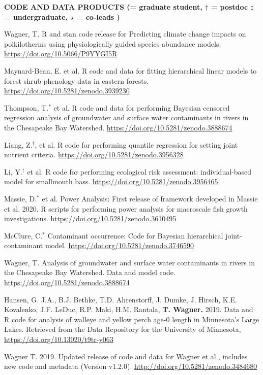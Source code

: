 \documentclass[10pt]{article}
\begin{document}
\begin{flushleft}
\centerline {\bf{CODE AND DATA PRODUCTS ({\small * = graduate student, $\dagger$ = postdoc $\ddagger$ = undergraduate, $\star$ = co-leads })}}
\vspace{5pt}
\begin{etaremune}
	\item Wagner, T. R and stan code release for Predicting climate change impacts on poikilotherms using physiologically guided species abundance models. \url{https://doi.org/10.5066/P9YYGI5R}
	\item Maynard-Bean, E. et al. R code and data for fitting hierarchical linear models to forest shrub phenology data in eastern forests. \url{https://doi.org/10.5281/zenodo.3939230}
	\item Thompson, T.$^*$ et al. R code and data for performing Bayesian censored regression analysis of groundwater and surface water contaminants in rivers in the Chesapeake Bay Watershed. \url{https://doi.org/10.5281/zenodo.3888674}
	\item Liang, Z.$^\dagger$, et al. R code for performing quantile regression for setting joint nutrient criteria. \url{https://doi.org/10.5281/zenodo.3956328}
	\item Li, Y.$^\dagger$ et al. R code for performing ecological risk assessment: individual-based model for smallmouth bass. \url{https://doi.org/10.5281/zenodo.3956465}
	\item Massie, D.$^*$ et al. Power Analysis: First release of framework developed in Massie et al. 2020. R scripts for performing power analysis for macroscale fish growth investigations. \url{https://doi.org/10.5281/zenodo.3610495}
	\item McClure, C.$^*$ Contaminant occurrence: Code for Bayesian hierarchical joint-contaminant model. \url{https://doi.org/10.5281/zenodo.3746590}
	\item Wagner, T. Analysis of groundwater and surface water contaminants in rivers in the Chesapeake Bay Watershed. Data and model code. \url{https://doi.org/10.5281/zenodo.3888674}
	\item Hansen, G. J.A., B.J. Bethke, T.D. Ahrenstorff,  J. Dumke, J.  Hirsch,  K.E. Kovalenko,  J.F. LeDuc, R.P.  Maki,  H.M. Rantala, \textbf{T. Wagner.} 2019. Data and R code for analysis of walleye and yellow perch age-0 length in Minnesota's Large Lakes. Retrieved from the Data Repository for the University of Minnesota, \url{https://doi.org/10.13020/t9tr-y063}
\item Wagner T. 2019. Updated release of code and data for Wagner et al., includes new code and metadata (Version v1.2.0). \url{http://doi.org/10.5281/zenodo.3484680}
	

\end{etaremune}
\end{flushleft}
\end{document}
